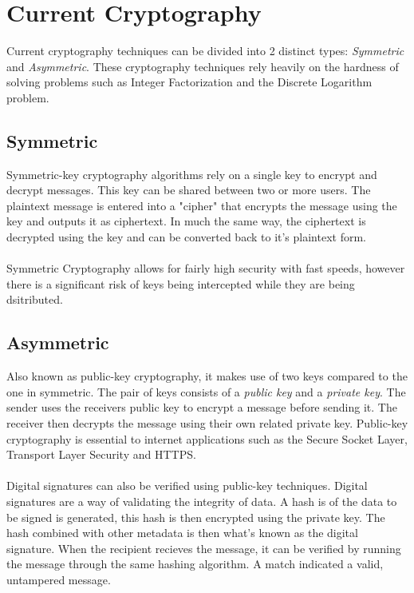 \documentclass[journal]{IEEEtran}
\begin{document}
\section{Current Cryptography}
Current cryptography techniques can be divided into 2 distinct types: \emph{Symmetric} and 
\emph{Asymmetric}. These cryptography techniques rely heavily on the hardness of solving problems such as Integer Factorization and the Discrete 
Logarithm problem.

\subsection{Symmetric}
Symmetric-key cryptography algorithms rely on a single key to encrypt and decrypt messages. This key can be shared between two or more users.
The plaintext message is entered into a "cipher" that encrypts the message using the key and outputs it as ciphertext. In much the same way,
the ciphertext is decrypted using the key and can be converted back to it's plaintext form. \\ \\
Symmetric Cryptography allows for fairly high security with fast speeds,
however there is a significant risk of keys being intercepted while they are being dsitributed.
\subsection{Asymmetric}
Also known as public-key cryptography, it makes use of two keys compared to the one in symmetric. The pair of keys consists of a \emph{public key} and a \emph{private key}.
The sender uses the receivers public key to encrypt a message before sending it. The receiver then decrypts the message using their own related private key. Public-key cryptography is essential to
internet applications such as the Secure Socket Layer, Transport Layer Security and HTTPS. \\ \\ 
Digital signatures can also be verified using public-key techniques. Digital signatures are a way of validating the integrity of data.
A hash is of the data to be signed is generated, this hash is then encrypted using the private key. The hash combined with other metadata is then what's known as the digital signature.
When the recipient recieves the message, it can be verified by running the message through the same hashing algorithm. A match indicated a valid, untampered message.
\end{document}
